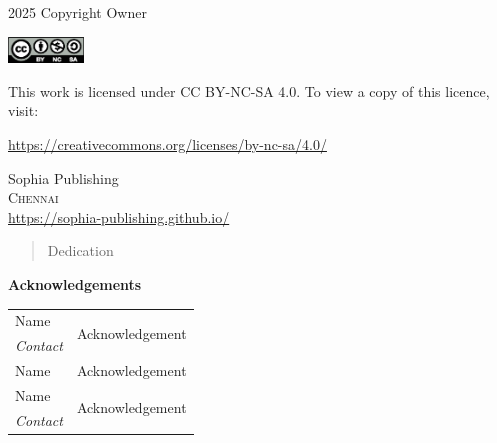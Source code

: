\begingroup
\footnotesize
\setlength{\parindent}{0pt}
\setlength{\parskip}{\baselineskip}

\textcopyright{} 2025 Copyright Owner

\includegraphics[height=20pt]{by-nc-sa.eps}

This work is licensed under CC BY-NC-SA 4.0. To view a copy of this licence,
visit:

\url{https://creativecommons.org/licenses/by-nc-sa/4.0/}

\vfill

Sophia Publishing \\
\textsc{Chennai} \\
\url{https://sophia-publishing.github.io/} \\
\endgroup

\clearpage

\begin{quote}
\begin{center}
	Dedication
\end{center}
\end{quote}

\vfill

\textbf{Acknowledgements}

\footnotesize
\begin{tabular}{ll}
    Name & \multirow{2}{*}{Acknowledgement} \\
    \emph{Contact} & \\
    Name & Acknowledgement\\
    Name & \multirow{2}{*}{Acknowledgement} \\
    \emph{Contact} & \\
\end{tabular}

\clearpage
